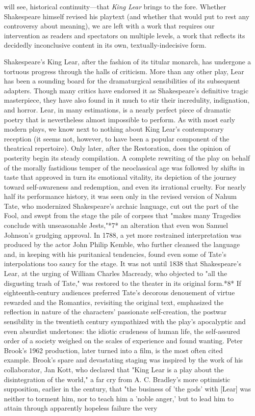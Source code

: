will see, historical continuity---that \emph{King Lear} brings to the fore. Whether Shakespeare himself revised his playtext (and whether that would put to rest any controversy about meaning), we are left with a work that requires our intervention as readers and spectators on multiple levels, a work that reflects its decidedly inconclusive content in its own, textually-indecisive form.

Shakespeare's King Lear, after the fashion of its titular monarch, has undergone a tortuous progress through the halls of criticism. More than any other play, Lear has been a sounding board for the dramaturgical sensibilities of its subsequent adapters. Though many critics have endorsed it as Shakespeare's definitive tragic masterpiece, they have also found in it much to stir their incredulity, indignation, and horror. Lear, in many estimations, is a nearly perfect piece of dramatic poetry that is nevertheless almost impossible to perform. As with most early modern plays, we know next to nothing about King Lear's contemporary reception (it seems not, however, to have been a popular component of the theatrical repertoire). Only later, after the Restoration, does the opinion of posterity begin its steady compilation. A complete rewriting of the play on behalf of the morally fastidious temper of the neoclassical age was followed by shifts in taste that approved in turn its emotional vitality, its depiction of the journey toward self-awareness and redemption, and even its irrational cruelty. For nearly half its performance history, it was seen only in the revised version of Nahum Tate, who modernized Shakespeare's archaic language, cut out the part of the Fool, and swept from the stage the pile of corpses that "makes many Tragedies conclude with unseasonable Jests,"*7* an alteration that even won Samuel Johnson's grudging approval. In 1788, a yet more restrained interpretation was produced by the actor John Philip Kemble, who further cleansed the language and, in keeping with his puritanical tendencies, found even some of Tate's interpolations too saucy for the stage. It was not until 1838 that Shakespeare's Lear, at the urging of William Charles Macready, who objected to "all the disgusting trash of Tate," was restored to the theater in its original form.*8* If eighteenth-century audiences preferred Tate's decorous denouement of virtue rewarded and the Romantics, revisiting the original text, emphasized the reflection in nature of the characters' passionate self-creation, the postwar sensibility in the twentieth century sympathized with the play's apocalyptic and even absurdist undertones: the idiotic crudeness of human life, the self-assured order of a society weighed on the scales of experience and found wanting. Peter Brook's 1962 production, later turned into a film, is the most often cited example. Brook's spare and devastating staging was inspired by the work of his collaborator, Jan Kott, who declared that "King Lear is a play about the disintegration of the world," a far cry from A. C. Bradley's more optimistic supposition, earlier in the century, that "the business of 'the gods' with [Lear] was neither to torment him, nor to teach him a 'noble anger,' but to lead him to attain through apparently hopeless failure the very 